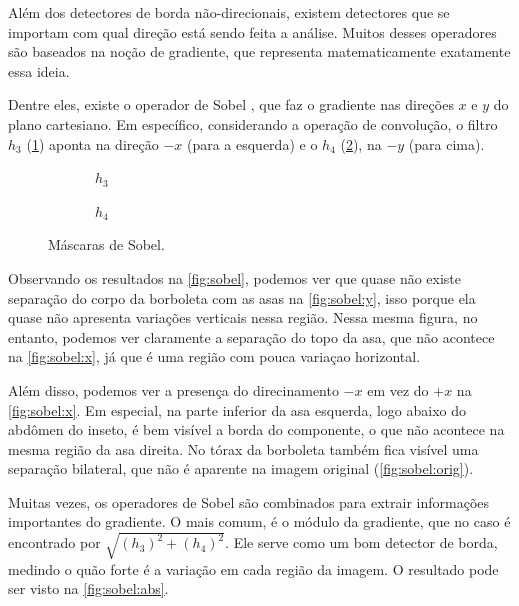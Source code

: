 Além dos detectores de borda não-direcionais, existem detectores que se importam com qual direção está sendo feita a análise. Muitos desses operadores são baseados na noção de gradiente, que representa matematicamente exatamente essa ideia.

Dentre eles, existe o operador de Sobel \autocite{ref:sobel}, que faz o gradiente nas direções $x$ e $y$ do plano cartesiano. Em específico, considerando a operação de convolução, o filtro $h_3$ (\ref{fig:h3}) aponta na direção $-x$ (para a esquerda) e o $h_4$ (\ref{fig:h4}), na $-y$ (para cima).

\begin{figure}[H]
    \centering
    \begin{subfigure}{0.4\textwidth}
        \centering
        
        \caption{~$h_3$}
        \label{fig:h3}
    \end{subfigure}%
    \begin{subfigure}{0.4\textwidth}
        \centering
        
        \caption{~$h_4$}
        \label{fig:h4}
    \end{subfigure}

    \caption{Máscaras de Sobel.}
    \label{fig:sobel:kernel}
\end{figure}

Observando os resultados na \cref{fig:sobel}, podemos ver que quase não existe separação do corpo da borboleta com as asas na \cref{fig:sobel:y}, isso porque ela quase não apresenta variações verticais nessa região. Nessa mesma figura, no entanto, podemos ver claramente a separação do topo da asa, que não acontece na \cref{fig:sobel:x}, já que é uma região com pouca variaçao horizontal.

Além disso, podemos ver a presença do direcinamento $-x$ em vez do $+x$ na \ref{fig:sobel:x}. Em especial, na parte inferior da asa esquerda, logo abaixo do abdômen do inseto, é bem visível a borda do componente, o que não acontece na mesma região da asa direita. No tórax da borboleta também fica visível uma separação bilateral, que não é aparente na imagem original (\ref{fig:sobel:orig}).

Muitas vezes, os operadores de Sobel são combinados para extrair informações importantes do gradiente. O mais comum, é o módulo da gradiente, que no caso é encontrado por $\sqrt{\left(h_3\right)^2 + \left(h_4\right)^2}$. Ele serve como um bom detector de borda, medindo o quão forte é a variação em cada região da imagem. O resultado pode ser visto na \cref{fig:sobel:abs}.

